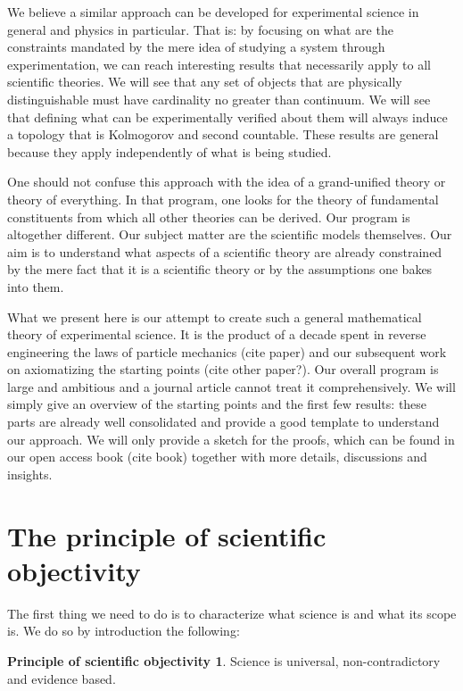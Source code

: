 \documentclass[letterpaper]{article}
\theoremstyle{plain}%
\theoremstyle{definition}
\newtheorem*{principle*}{Principle of scientific objectivity}
\theoremstyle{remark}
\begin{document}
We believe a similar approach can be developed for experimental science in general and physics in particular. That is: by focusing on what are the constraints mandated by the mere idea of studying a system through experimentation, we can reach interesting results that necessarily apply to all scientific theories. We will see that any set of objects that are physically distinguishable must have cardinality no greater than continuum. We will see that defining what can be experimentally verified about them will always induce a topology that is Kolmogorov and second countable. These results are general because they apply independently of what is being studied.

One should not confuse this approach with the idea of a grand-unified theory or theory of everything. In that program, one looks for the theory of fundamental constituents from which all other theories can be derived. Our program is altogether different. Our subject matter are the scientific models themselves. Our aim is to understand what aspects of a scientific theory are already constrained by the mere fact that it is a scientific theory or by the assumptions one bakes into them.

What we present here is our attempt to create such a general mathematical theory of experimental science. It is the product of a decade spent in reverse engineering the laws of particle mechanics (cite paper) and our subsequent work on axiomatizing the starting points (cite other paper?). Our overall program is large and ambitious and a journal article cannot treat it comprehensively. We will simply give an overview of the starting points and the first few results: these parts are already well consolidated and provide a good template to understand our approach. We will only provide a sketch for the proofs, which can be found in our open access book (cite book) together with more details, discussions and insights.

\section{The principle of scientific objectivity}

The first thing we need to do is to characterize what science is and what its scope is. We do so by introduction the following:

\begin{principle*}
Science is universal, non-contradictory and evidence based.
\end{principle*}
\end{document}
